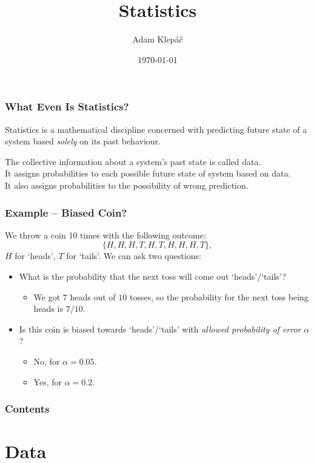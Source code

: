 \documentclass[aspectratio=169,11pt,svgnames,handout]{beamer}
\title{Statistics}
\date{\today}
\author{Adam Klepáč}
\institute[GEVO]{Gymnázium Evolution Jižní Město}
\begin{document}
\titleframe

\begin{frame}
 \frametitle{What Even Is Statistics?}
 \begin{tcolorbox}[title=Statistics]
  \alert{Statistics} is a mathematical discipline concerned with predicting
  future state of a system based \emph{solely} on its past behaviour.
 \end{tcolorbox}
 \pause
 The collective information about a system's past state is called
 \alert{data}.\\
 \pause
 It assigns \alert{probabilities} to each possible future state of system based
 on data.\\
 \pause
 It also assigns probabilities to the \alert{possibility of wrong prediction}.
\end{frame}

\begin{frame}
 \frametitle{Example -- Biased Coin?}
 We throw a coin 10 times with the following outcome:
 \[
  \{H,H,H,T,H,T,H,H,H,T\},
 \]
 $H$ for `heads', $T$ for `tails'.
 \pause
 We can ask two questions:
 \pause
 \begin{itemize}[label=\textbullet]
  \item<3-> What is the probability that the \alert{next toss} will come out
   `heads'/`tails'?
  \begin{itemize}[label=\textminus]
   \item<5-> We got $7$ heads out of $10$ tosses, so the probability for the next toss
    being heads is $7 / 10$.
  \end{itemize}
  \item<4-> Is this coin is \alert{biased towards} `heads'/`tails' with
   \emph{allowed probability of error} $\alpha$?
   \begin{itemize}[label=\textminus]
    \item<6-> \alert{No}, for $\alpha = 0.05$.
    \item<6-> \alert{Yes}, for $\alpha = 0.2$.
   \end{itemize}
 \end{itemize}
\end{frame}

\begin{frame}
 \frametitle{Contents}
 \tableofcontents
\end{frame}

\section{Data}
\end{document}
